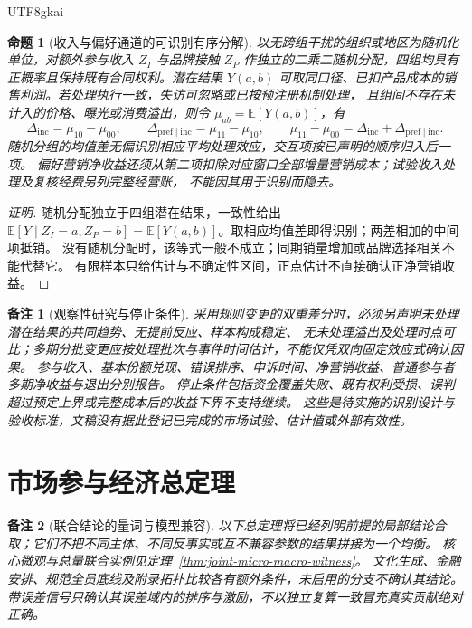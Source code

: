 \documentclass[12pt,a4paper,openany]{report}
\newtheorem{proposition}{命题}[chapter]
\newtheorem{remark}{备注}[chapter]
\newcommand{\EE}{\mathbb E}
\begin{document}
\begin{CJK*}{UTF8}{gkai}
\begin{proposition}[收入与偏好通道的可识别有序分解]
\label{prop:factorial-channel-identification}
以无跨组干扰的组织或地区为随机化单位，对额外参与收入 \(Z_I\) 与品牌接触 \(Z_P\)
作独立的二乘二随机分配，四组均具有正概率且保持既有合同权利。潜在结果
\(Y(a,b)\) 可取同口径、已扣产品成本的销售利润。若处理执行一致，失访可忽略或已按预注册机制处理，
且组间不存在未计入的价格、曝光或消费溢出，则令 \(\mu_{ab}=\EE[Y(a,b)]\)，有
\[
 \Delta_{\mathrm{inc}}=\mu_{10}-\mu_{00},\qquad
 \Delta_{\mathrm{pref}\mid\mathrm{inc}}=\mu_{11}-\mu_{10},\qquad
 \mu_{11}-\mu_{00}=\Delta_{\mathrm{inc}}+\Delta_{\mathrm{pref}\mid\mathrm{inc}}.
\]
随机分组的均值差无偏识别相应平均处理效应，交互项按已声明的顺序归入后一项。
偏好营销净收益还须从第二项扣除对应窗口全部增量营销成本；试验收入处理及复核经费另列完整经营账，
不能因其用于识别而隐去。
\end{proposition}
\begin{proof}[证明]
随机分配独立于四组潜在结果，一致性给出
\(\EE[Y\mid Z_I=a,Z_P=b]=\EE[Y(a,b)]\)。取相应均值差即得识别；两差相加的中间项抵销。
没有随机分配时，该等式一般不成立；同期销量增加或品牌选择相关不能代替它。
有限样本只给估计与不确定性区间，正点估计不直接确认正净营销收益。
\end{proof}

\begin{remark}[观察性研究与停止条件]
采用规则变更的双重差分时，必须另声明未处理潜在结果的共同趋势、无提前反应、样本构成稳定、
无未处理溢出及处理时点可比；多期分批变更应按处理批次与事件时间估计，不能仅凭双向固定效应式确认因果。
参与收入、基本份额兑现、错误排序、申诉时间、净营销收益、普通参与者多期净收益与退出分别报告。
停止条件包括资金覆盖失败、既有权利受损、误判超过预定上界或完整成本后的收益下界不支持继续。
这些是待实施的识别设计与验收标准，文稿没有据此登记已完成的市场试验、估计值或外部有效性。
\end{remark}

\section{市场参与经济总定理}

\begin{remark}[联合结论的量词与模型兼容]
以下总定理将已经列明前提的局部结论合取；它们不把不同主体、不同反事实或互不兼容参数的结果拼接为一个均衡。
核心微观与总量联合实例见定理~\ref{thm:joint-micro-macro-witness}。
文化生成、金融安排、规范全员底线及附录拓扑比较各有额外条件，未启用的分支不确认其结论。
带误差信号只确认其误差域内的排序与激励，不以独立复算一致冒充真实贡献绝对正确。
\end{remark}


\end{CJK*}
\end{document}
